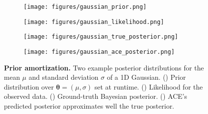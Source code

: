 \documentclass[twoside]{article}
\newcommand{\vtheta}{{\bm{\theta}}}
\begin{document}
\begin{figure}[t!]
    \centering
    \begin{subfigure}[t]{0.258\linewidth}
        \centering
        \texttt{[image: figures/gaussian\_prior.png]}
        \caption{}
        \label{fig:prior_distribution}
    \end{subfigure}
    \hfill
    \begin{subfigure}[t]{0.215\linewidth}
        \centering
        \texttt{[image: figures/gaussian\_likelihood.png]}
        \caption{}
        \label{fig:likelihood}
    \end{subfigure}
    \hfill
    \begin{subfigure}[t]{0.215\linewidth}
        \centering
        \texttt{[image: figures/gaussian\_true\_posterior.png]}
        \caption{}
        \label{fig:true_posterior}
    \end{subfigure}
    \hfill
    \begin{subfigure}[t]{0.215\linewidth}
        \centering
        \texttt{[image: figures/gaussian\_ace\_posterior.png]}
        \caption{}
        \label{fig:ace_predicted_posterior}
    \end{subfigure}
    \vspace{-5cm}
    \caption{\textbf{Prior amortization.} Two example posterior distributions for the mean $\mu$ and standard deviation $\sigma$ of a 1D Gaussian. () Prior distribution over $\vtheta = (\mu, \sigma)$ set at runtime. () Likelihood for the observed data. () Ground-truth Bayesian posterior. () ACE's predicted posterior approximates well the true posterior.}
    \label{fig:gaussian_examples_main}
\end{figure}
\end{document}

